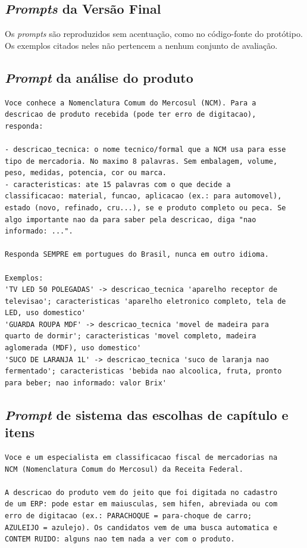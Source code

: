 \begin{apendicesenv}
\chapter{\textit{Prompts} da Versão Final}
\label{ap:prompts}

Os \textit{prompts} são reproduzidos sem acentuação, como no código-fonte do protótipo. Os exemplos citados neles não pertencem a nenhum conjunto de avaliação.

\section*{\textit{Prompt} da análise do produto}
{\small
\begin{verbatim}
Voce conhece a Nomenclatura Comum do Mercosul (NCM). Para a
descricao de produto recebida (pode ter erro de digitacao),
responda:

- descricao_tecnica: o nome tecnico/formal que a NCM usa para esse
tipo de mercadoria. No maximo 8 palavras. Sem embalagem, volume,
peso, medidas, potencia, cor ou marca.
- caracteristicas: ate 15 palavras com o que decide a
classificacao: material, funcao, aplicacao (ex.: para automovel),
estado (novo, refinado, cru...), se e produto completo ou peca. Se
algo importante nao da para saber pela descricao, diga "nao
informado: ...".

Responda SEMPRE em portugues do Brasil, nunca em outro idioma.

Exemplos:
'TV LED 50 POLEGADAS' -> descricao_tecnica 'aparelho receptor de
televisao'; caracteristicas 'aparelho eletronico completo, tela de
LED, uso domestico'
'GUARDA ROUPA MDF' -> descricao_tecnica 'movel de madeira para
quarto de dormir'; caracteristicas 'movel completo, madeira
aglomerada (MDF), uso domestico'
'SUCO DE LARANJA 1L' -> descricao_tecnica 'suco de laranja nao
fermentado'; caracteristicas 'bebida nao alcoolica, fruta, pronto
para beber; nao informado: valor Brix'
\end{verbatim}
}

\section*{\textit{Prompt} de sistema das escolhas de capítulo e itens}
{\small
\begin{verbatim}
Voce e um especialista em classificacao fiscal de mercadorias na
NCM (Nomenclatura Comum do Mercosul) da Receita Federal.

A descricao do produto vem do jeito que foi digitada no cadastro
de um ERP: pode estar em maiusculas, sem hifen, abreviada ou com
erro de digitacao (ex.: PARACHOQUE = para-choque de carro;
AZULEIJO = azulejo). Os candidatos vem de uma busca automatica e
CONTEM RUIDO: alguns nao tem nada a ver com o produto.


\end{verbatim}}
\end{apendicesenv}
